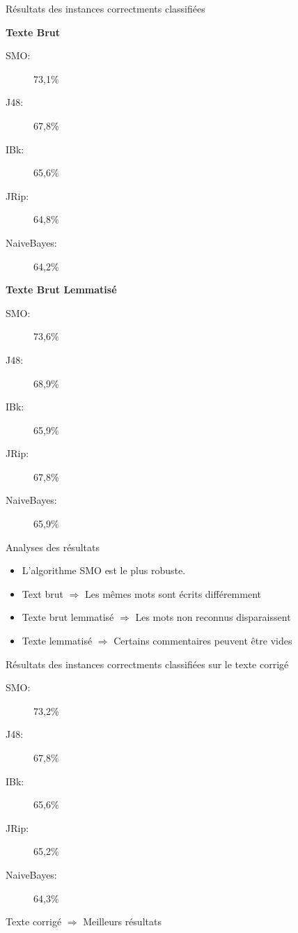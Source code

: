 \documentclass{beamer}
\begin{document}
\begin{frame}
	\begin{block}{Résultats des instances correctments classifiées}
	\begin{minipage}{0.4\textwidth}\center
		\textbf{Texte Brut}
		\begin{description}
			\item[SMO: ]73,1\%
			\item[J48: ]67,8\%
			\item[IBk: ]65,6\%
			\item[JRip: ]64,8\%
			\item[NaiveBayes: ]64,2\%
		\end{description}	
		\end{minipage}
		\begin{minipage}{0.4\textwidth}\center
		\textbf{Texte Brut Lemmatisé}
		\begin{description}
			\item[SMO: ]73,6\%
			\item[J48: ]68,9\%
			\item[IBk: ]65,9\%
			\item[JRip: ]67,8\%
			\item[NaiveBayes: ]65,9\%
		\end{description}	
		\end{minipage}
	\end{block}
\end{frame}

\begin{frame}
	\begin{block}{Analyses des résultats}
	\begin{itemize}
		\item L'algorithme SMO est le plus robuste.
		\item Text brut $\Rightarrow$ Les mêmes mots sont écrits différemment
		\item Texte brut lemmatisé $\Rightarrow$ Les mots non reconnus disparaissent
		\item Texte lemmatisé $\Rightarrow$ Certains commentaires peuvent être vides
	\end{itemize}

	\end{block}
\end{frame}

\begin{frame}
	\begin{block}{Résultats des instances correctments classifiées sur le texte corrigé}
		\begin{description}
			\item[SMO: ]73,2\%
			\item[J48: ]67,8\%
			\item[IBk: ]65,6\%
			\item[JRip: ]65,2\%
			\item[NaiveBayes: ]64,3\%
		\end{description}	
		
		Texte corrigé $\Rightarrow$ Meilleurs résultats
	\end{block}
\end{frame}
\end{document}
